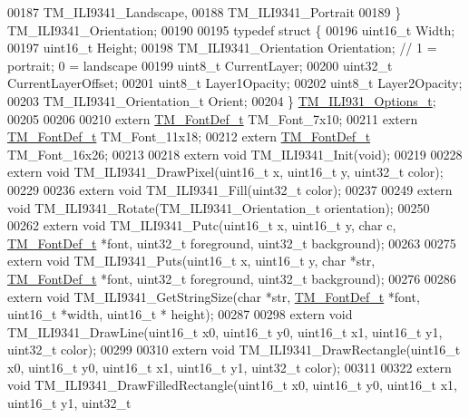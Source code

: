 \begin{DoxyCode}
00187     TM\_ILI9341\_Landscape,
00188     TM\_ILI9341\_Portrait
00189 \} TM\_ILI9341\_Orientation;
00190 
00195 \textcolor{keyword}{typedef} \textcolor{keyword}{struct }\{
00196     uint16\_t Width;
00197     uint16\_t Height;
00198     TM\_ILI9341\_Orientation Orientation; \textcolor{comment}{// 1 = portrait; 0 = landscape}
00199     uint8\_t CurrentLayer;
00200     uint32\_t CurrentLayerOffset;
00201     uint8\_t Layer1Opacity;
00202     uint8\_t Layer2Opacity;
00203     TM\_ILI9341\_Orientation\_t Orient;
00204 \} \hyperlink{struct_t_m___i_l_i931___options__t}{TM\_ILI931\_Options\_t};
00205 
00206 
00210 \textcolor{keyword}{extern} \hyperlink{struct_t_m___font_def__t}{TM\_FontDef\_t} TM\_Font\_7x10;
00211 \textcolor{keyword}{extern} \hyperlink{struct_t_m___font_def__t}{TM\_FontDef\_t} TM\_Font\_11x18;
00212 \textcolor{keyword}{extern} \hyperlink{struct_t_m___font_def__t}{TM\_FontDef\_t} TM\_Font\_16x26;
00213 
00218 \textcolor{keyword}{extern} \textcolor{keywordtype}{void} TM\_ILI9341\_Init(\textcolor{keywordtype}{void});
00219 
00228 \textcolor{keyword}{extern} \textcolor{keywordtype}{void} TM\_ILI9341\_DrawPixel(uint16\_t x, uint16\_t y, uint32\_t color);
00229 
00236 \textcolor{keyword}{extern} \textcolor{keywordtype}{void} TM\_ILI9341\_Fill(uint32\_t color);
00237 
00249 \textcolor{keyword}{extern} \textcolor{keywordtype}{void} TM\_ILI9341\_Rotate(TM\_ILI9341\_Orientation\_t orientation);
00250 
00262 \textcolor{keyword}{extern} \textcolor{keywordtype}{void} TM\_ILI9341\_Putc(uint16\_t x, uint16\_t y, \textcolor{keywordtype}{char} c, \hyperlink{struct_t_m___font_def__t}{TM\_FontDef\_t} *font, uint32\_t 
      foreground, uint32\_t background);
00263 
00275 \textcolor{keyword}{extern} \textcolor{keywordtype}{void} TM\_ILI9341\_Puts(uint16\_t x, uint16\_t y, \textcolor{keywordtype}{char} *str, \hyperlink{struct_t_m___font_def__t}{TM\_FontDef\_t} *font, uint32\_t 
      foreground, uint32\_t background);
00276 
00286 \textcolor{keyword}{extern} \textcolor{keywordtype}{void} TM\_ILI9341\_GetStringSize(\textcolor{keywordtype}{char} *str, \hyperlink{struct_t_m___font_def__t}{TM\_FontDef\_t} *font, uint16\_t *width, uint16\_t *
      height);
00287 
00298 \textcolor{keyword}{extern} \textcolor{keywordtype}{void} TM\_ILI9341\_DrawLine(uint16\_t x0, uint16\_t y0, uint16\_t x1, uint16\_t y1, uint32\_t color);
00299 
00310 \textcolor{keyword}{extern} \textcolor{keywordtype}{void} TM\_ILI9341\_DrawRectangle(uint16\_t x0, uint16\_t y0, uint16\_t x1, uint16\_t y1, uint32\_t color);
00311 
00322 \textcolor{keyword}{extern} \textcolor{keywordtype}{void} TM\_ILI9341\_DrawFilledRectangle(uint16\_t x0, uint16\_t y0, uint16\_t x1, uint16\_t y1, uint32\_t 

\end{DoxyCode}
